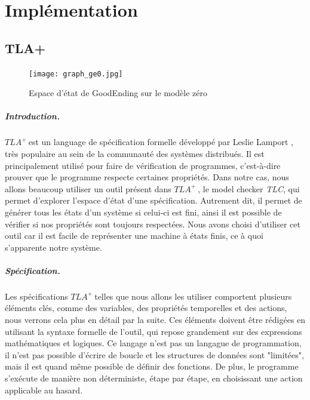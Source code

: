 \documentclass[oneside, a4paper, 11pt]{book}
\newcommand{\TLA}{\ensuremath{TLA^+~}}
\begin{document}
\chapter{Implémentation}
\label{sec:implem}

\section{TLA+}
\label{sec:tla}

\begin{figure}
	\centering
	\texttt{[image: graph\_ge0.jpg]}
	\caption{Espace d'état de GoodEnding sur le modèle zéro}
	\label{fig:espaceEtat}
\end{figure}


\paragraph{Introduction.} \TLA est un language de spécification formelle développé par Leslie Lamport , très populaire au sein de la communauté des systèmes distribués. Il est principalement utilisé pour faire de vérification de programmes, c'est-à-dire prouver que le programme respecte certaines propriétés.
Dans notre cas, nous allons beaucoup utiliser un outil présent dans \TLA, le model checker \textit{TLC}, qui permet d'explorer l'espace d'état d'une spécification. Autrement dit, il permet de générer tous les états d'un système si celui-ci est fini, ainsi il est possible de vérifier si nos propriétés sont toujours respectées.
Nous avons choisi d'utiliser cet outil car il est facile de représenter une machine à états finis, ce à quoi s'apparente notre système.

\paragraph{Spécification.} Les spécifications \TLA telles que nous allons les utiliser comportent plusieurs éléments clés, comme des variables, des propriétés temporelles et des actions, nous verrons cela plus en détail par la suite.
Ces éléments doivent être rédigées en utilisant la syntaxe formelle de l'outil, qui repose grandement sur des expressions mathématiques et logiques. Ce langage n'est pas un langague de programmation, il n'est pas possible d'écrire de boucle et les structures de données sont "limitées", mais il est quand même possible de définir des fonctions. 
De plus, le programme s'exécute de manière non déterministe, étape par étape, en choisissant une action applicable au hasard.
\end{document}
